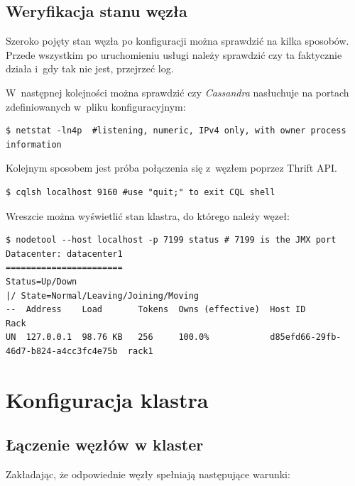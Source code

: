 \documentclass{article} %
\begin{document}
\subsection{Weryfikacja stanu węzła}\label{subsec:config_check}

Szeroko pojęty stan węzła po konfiguracji można sprawdzić na kilka sposobów.
Przede wszystkim po uruchomieniu usługi należy sprawdzić czy ta faktycznie działa i~gdy tak nie jest, przejrzeć log.

W~następnej kolejności można sprawdzić czy \emph{Cassandra} nasłuchuje na portach zdefiniowanych w~pliku konfiguracyjnym:

\begin{lstlisting}[style=bash, caption={sprawdzanie na których portach nasłuchuje \emph{Cassandra}}]
$ netstat -ln4p  #listening, numeric, IPv4 only, with owner process information
\end{lstlisting}

Kolejnym sposobem jest próba połączenia się z~węzłem poprzez Thrift API.

\begin{lstlisting}[style=bash, caption={dostęp do \emph{Cassandry} przez \emph{Thrift API}.}]
$ cqlsh localhost 9160 #use "quit;" to exit CQL shell
\end{lstlisting}

Wreszcie można wyświetlić stan klastra, do którego należy węzeł:

\begin{lstlisting}[style=bash, caption={sprawdzanie stanu klastra}]
$ nodetool --host localhost -p 7199 status # 7199 is the JMX port
Datacenter: datacenter1
=======================
Status=Up/Down
|/ State=Normal/Leaving/Joining/Moving
--  Address    Load       Tokens  Owns (effective)  Host ID                               Rack
UN  127.0.0.1  98.76 KB   256     100.0%            d85efd66-29fb-46d7-b824-a4cc3fc4e75b  rack1
\end{lstlisting}

\section{Konfiguracja klastra}\label{sec:cluster}

\subsection{Łączenie węzłów w klaster}\label{subsec:cluster_connecting}

Zakładając, że odpowiednie węzły spełniają następujące warunki:
\end{document}
